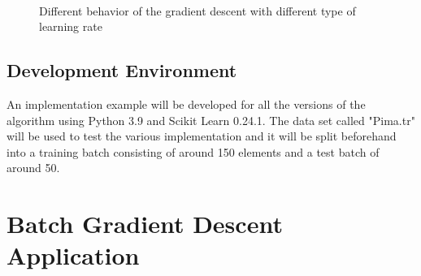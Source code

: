 \documentclass[conference]{IEEEtran}
\begin{document}
\begin{figure}[ht!]
     \begin{center}
        \\ %
%
    \end{center}
    \caption{%
        Different behavior of the gradient descent with different type of learning rate\cite{Scikit-Learn}
     }%
   \label{fig:gradientbehavior}
\end{figure}
\subsection{Development Environment}
An implementation example will be developed for all the versions of the algorithm using Python 3.9 and Scikit Learn 0.24.1. The data set called "Pima.tr" will be used to test the various implementation and it will be split beforehand into a training batch consisting of around 150 elements and a test batch of around 50. 
\section{Batch Gradient Descent Application}
\end{document}
